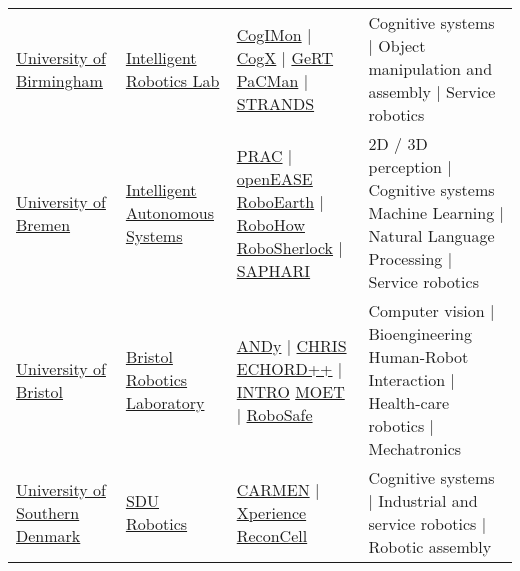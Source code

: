 \begin{table}[H]
\begin{tabu} { X[m,c] X[0.9,m,c] X[1.2,m,c] X[1.8,m,c] }
		\tabucline[1pt on 1.5pt off 3pt]{-}
		\href{http://www.birmingham.ac.uk}{University of Birmingham} &
		\href{https://www.cs.bham.ac.uk/research/groupings/robotics/}{Intelligent Robotics Lab} &
		\href{https://cogimon.eu}{CogIMon} | \href{https://www.cs.bham.ac.uk/research/groupings/robotics/projects/cogx}{CogX} | \href{https://www.cs.bham.ac.uk/~rwd/research/gert-main.php}{GeRT} \href{http://www.pacman-project.eu/}{PaCMan} | \href{http://strands.acin.tuwien.ac.at/}{STRANDS} &
		Cognitive systems | Object manipulation and assembly | Service robotics \\

		\tabucline[1pt on 1.5pt off 3pt]{-}
		\href{http://www.uni-bremen.de/en.html}{University of Bremen} &
		\href{http://ai.uni-bremen.de/research/ias}{Intelligent Autonomous Systems} &
		\href{http://www.actioncores.org/}{PRAC} | \href{http://www.open-ease.org/}{openEASE} \href{http://roboearth.org/}{RoboEarth} | \href{https://robohow.eu}{RoboHow} \href{http://www.robosherlock.org/}{RoboSherlock} | \href{http://www.saphari.eu}{SAPHARI} &
		2D / 3D perception | Cognitive systems Machine Learning | Natural Language Processing | Service robotics \\

		\tabucline[1pt on 1.5pt off 3pt]{-}
		\href{http://www.bristol.ac.uk}{University of Bristol} &
		\href{http://www.brl.ac.uk/}{Bristol Robotics Laboratory} &
		\href{http://www.brl.ac.uk/research/researchthemes/nonlinearcontrolinrobotics/anthropomorphicdynamics.aspx}{ANDy} | \href{http://www.chrisfp7.eu/}{CHRIS} \href{http://echord.eu/}{ECHORD++} | \href{http://introbotics.eu/}{INTRO} \href{http://www.brl.ac.uk/research/researchthemes/robotvision/moetmanipulationofobjects.aspx}{MOET} | \href{http://www.robosafe.org/}{RoboSafe} &
		Computer vision | Bioengineering Human-Robot Interaction | Health-care robotics | Mechatronics \\

		\tabucline[1pt on 1.5pt off 3pt]{-}
		\href{http://www.sdu.dk/en}{University of Southern Denmark} &
		\href{http://www.sdu.dk/en/om_sdu/institutter_centre/sdurobotics}{SDU Robotics} &
		\href{http://caro.sdu.dk/index.php/projects/projectslist?view=project\&task=show\&id=6}{CARMEN} | \href{http://www.xperience.org/}{Xperience} \href{http://www.reconcell.eu/}{ReconCell} &
		Cognitive systems | Industrial and service robotics | Robotic assembly \\
	\end{tabu}
	\label{tab:label}
\end{table}



